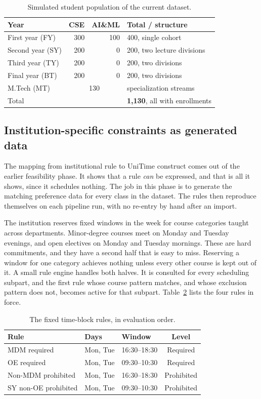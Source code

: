 \documentclass[journal]{IEEEtran}
\begin{document}
\begin{table}[t]
\centering
\caption{Simulated student population of the current dataset.}
\label{tab:population}
\footnotesize
\begin{tabular}{@{}lrrl@{}}
\toprule
Year & CSE & AI\&ML & Total / structure \\
\midrule
First year (FY) & 300 & 100 & 400, single cohort \\
Second year (SY) & 200 & 0 & 200, two lecture divisions \\
Third year (TY) & 200 & 0 & 200, two divisions \\
Final year (BT) & 200 & 0 & 200, two divisions \\
M.Tech (MT) & \multicolumn{2}{c}{130} & specialization streams \\
\midrule
Total & \multicolumn{2}{c}{} & \textbf{1{,}130}, all with enrollments \\
\bottomrule
\end{tabular}
\end{table}

\subsection{Institution-specific constraints as generated data}
The mapping from institutional rule to UniTime construct comes out of the earlier feasibility phase. It shows that a rule \emph{can} be expressed, and that is all it shows, since it schedules nothing. The job in this phase is to generate the matching preference data for every class in the dataset. The rules then reproduce themselves on each pipeline run, with no re-entry by hand after an import.

The institution reserves fixed windows in the week for course categories taught across departments. Minor-degree courses meet on Monday and Tuesday evenings, and open electives on Monday and Tuesday mornings. These are hard commitments, and they have a second half that is easy to miss. Reserving a window for one category achieves nothing unless every other course is kept out of it. A small rule engine handles both halves. It is consulted for every scheduling subpart, and the first rule whose course pattern matches, and whose exclusion pattern does not, becomes active for that subpart. Table~\ref{tab:blocks} lists the four rules in force.

\begin{table}[t]
\centering
\caption{The fixed time-block rules, in evaluation order.}
\label{tab:blocks}
\footnotesize
\begin{tabular}{@{}lllc@{}}
\toprule
Rule & Days & Window & Level \\
\midrule
MDM required & Mon, Tue & 16:30--18:30 & Required \\
OE required & Mon, Tue & 09:30--10:30 & Required \\
Non-MDM prohibited & Mon, Tue & 16:30--18:30 & Prohibited \\
SY non-OE prohibited & Mon, Tue & 09:30--10:30 & Prohibited \\
\bottomrule
\end{tabular}
\end{table}
\end{document}
